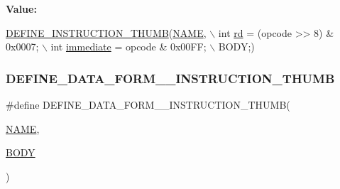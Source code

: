 {\bfseries Value\+:}
\begin{DoxyCode}
\mbox{\hyperlink{isa-thumb_8c_aca0a4c9b536fe9f14f89105945cfeb3d}{DEFINE\_INSTRUCTION\_THUMB}}(\mbox{\hyperlink{inflate_8h_a164ea0159d5f0b5f12a646f25f99eceaa67bc2ced260a8e43805d2480a785d312}{NAME}}, \(\backslash\)
        \textcolor{keywordtype}{int} \mbox{\hyperlink{isa-arm_8c_a555541ce18ed9b5fad657a06b22cb465}{rd}} = (opcode >> 8) & 0x0007; \(\backslash\)
        int \mbox{\hyperlink{decoder-arm_8c_a8bc2501cb64b3bc9ac59754cfafb68d1}{immediate}} = opcode & 0x00FF; \(\backslash\)
        BODY;)
\end{DoxyCode}
\mbox{\label{isa-thumb_8c_aed065a01fc49f94adc94fbae3fe8ada1}} 
\subsubsection{\texorpdfstring{D\+E\+F\+I\+N\+E\+\_\+\+D\+A\+T\+A\+\_\+\+F\+O\+R\+M\+\_\+\_\+\+I\+N\+S\+T\+R\+U\+C\+T\+I\+O\+N\+\_\+\+T\+H\+U\+MB}{DEFINE\_DATA\_FORM\_5\_INSTRUCTION\_THUMB}}
{\footnotesize\ttfamily \#define D\+E\+F\+I\+N\+E\+\_\+\+D\+A\+T\+A\+\_\+\+F\+O\+R\+M\+\_\+\_\+\+I\+N\+S\+T\+R\+U\+C\+T\+I\+O\+N\+\_\+\+T\+H\+U\+MB(\begin{DoxyParamCaption}\item[{}]{\mbox{\hyperlink{inflate_8h_a164ea0159d5f0b5f12a646f25f99eceaa67bc2ced260a8e43805d2480a785d312}{N\+A\+ME}},  }\item[{}]{\mbox{\hyperlink{gzlog_8c_aa6bdf6a6d9916c343e1e17774d84a156}{B\+O\+DY}} }\end{DoxyParamCaption})}

